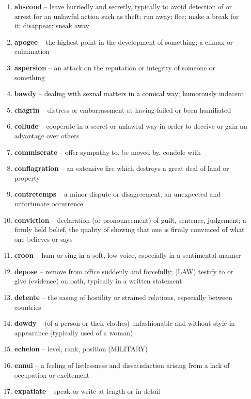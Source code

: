 \begin{enumerate}[wide,labelindent=0pt]
\item \textbf{abscond} -- leave hurriedly and secretly, typically to avoid detection of or arrest for an unlawful action such as theft; run away; flee; make a break for it; disappear; sneak away
\item \textbf{apogee} -- the highest point in the development of something; a climax or culmination
\item \textbf{aspersion} -- an attack on the reputation or integrity of someone or something
\item \textbf{bawdy} -- dealing with sexual matters in a comical way; humorously indecent
\item \textbf{chagrin} -- distress or embarrassment at having failed or been humiliated
\item \textbf{collude} -- cooperate in a secret or unlawful way in order to deceive or gain an advantage over others
\item \textbf{commiserate} -- offer sympathy to, be moved by, condole with
\item \textbf{conflagration} -- an extensive fire which destroys a great deal of land or property
\item \textbf{contretemps} -- a minor dispute or disagreement; an unexpected and unfortunate occurrence
\item \textbf{conviction} -- declaration (or pronouncement) of guilt, sentence, judgement; a firmly held belief, the quality of showing that one is firmly convinced of what one believes or says
\item \textbf{croon} -- hum or sing in a soft, low voice, especially in a sentimental manner
\item \textbf{depose} -- remove from office suddenly and forcefully; (LAW) testify to or give (evidence) on oath, typically in a written statement
\item \textbf{detente} -- the easing of hostility or strained relations, especially between countries
\item \textbf{dowdy} -- (of a person or their clothes) unfashionable and without style in appearance (typically used of a woman)
\item \textbf{echelon} -- level, rank, position (MILITARY)
\item \textbf{ennui} -- a feeling of listlessness and dissatisfaction arising from a lack of occupation or excitement
\item \textbf{expatiate} -- speak or write at length or in detail

\end{enumerate}
